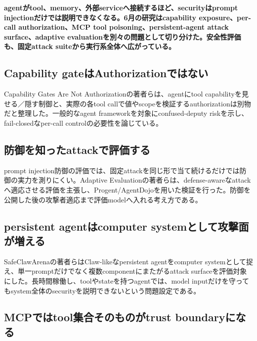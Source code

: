 \noindent\textbf{agentがtool、memory、外部serviceへ接続するほど、securityはprompt injectionだけでは説明できなくなる。6月の研究はcapability exposure、per-call authorization、MCP tool poisoning、persistent-agent attack surface、adaptive evaluationを別々の問題として切り分けた。安全性評価も、固定attack suiteから実行系全体へ広がっている。}\autocite{src-02da0db00c2d,src-6da0c5a88fa4,src-91b06074799d,src-c000018ba1f0,src-cd4b60edfee7}

\subsection{Capability gateはAuthorizationではない}

Capability Gates Are Not Authorizationの著者らは、agentにtool capabilityを見せる／隠す制御と、実際の各tool callで値やscopeを検証するauthorizationは別物だと整理した。一般的なagent frameworkを対象にconfused-deputy riskを示し、fail-closedなper-call controlの必要性を論じている。\autocite{src-02da0db00c2d}


\subsection{防御を知ったattackで評価する}

prompt injection防御の評価では、固定attackを同じ形で当て続けるだけでは防御の実力を測りにくい。Adaptive Evaluationの著者らは、defense-awareなattackへ適応させる評価を主張し、Progent/AgentDojoを用いた検証を行った。防御を公開した後の攻撃者適応まで評価modelへ入れる考え方である。\autocite{src-cd4b60edfee7}


\subsection{persistent agentはcomputer systemとして攻撃面が増える}

SafeClawArenaの著者らはClaw-likeなpersistent agentをcomputer systemとして捉え、単一promptだけでなく複数componentにまたがるattack surfaceを評価対象にした。長時間稼働し、toolやstateを持つagentでは、model inputだけを守ってもsystem全体のsecurityを説明できないという問題設定である。\autocite{src-6da0c5a88fa4}


\subsection{MCPではtool集合そのものがtrust boundaryになる}

